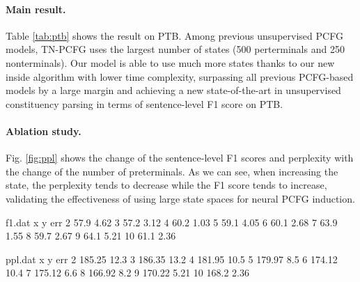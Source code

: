 \documentclass[11pt]{article}
\begin{document}
\paragraph{Main result.} Table \ref{tab:ptb} shows the result on PTB. Among previous unsupervised PCFG models, TN-PCFG \cite{yang-etal-2021-pcfgs} uses the largest number of states (500 perterminals and 250 nonterminals). Our model is able to use much more states thanks to our new inside algorithm with lower time complexity, surpassing all previous PCFG-based models by a large margin and achieving a new state-of-the-art in unsupervised constituency parsing in terms of sentence-level F1 score on PTB.

\paragraph{Ablation study.} Fig. \ref{fig:ppl} shows the change of the sentence-level F1 scores and perplexity with the change of the number of preterminals.
As we can see, when increasing the state, the perplexity tends to decrease while
the F1 score tends to increase, validating the effectiveness of using large state spaces for neural PCFG induction. 

\begin{filecontents*}{f1.dat}
x y err
2 57.9 4.62
3 57.2 3.12
4 60.2 1.03
5 59.1 4.05
6 60.1 2.68
7 63.9 1.55
8 59.7 2.67
9 64.1 5.21 
10 61.1 2.36
\end{filecontents*}
\begin{filecontents*}{ppl.dat}
x y err
2 185.25 12.3
3 186.35 13.2
4 181.95 10.5
5 179.97 8.5
6 174.12 10.4
7 175.12 6.6
8 166.92 8.2
9 170.22 5.21 
10 168.2 2.36
\end{filecontents*}
\end{document}
